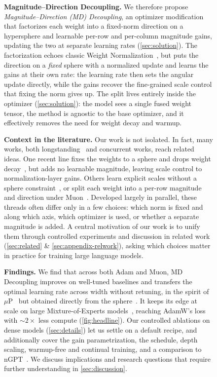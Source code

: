 \documentclass[10pt]{article} %
\begin{document}
\begin{figure}[t]
\textbf{Magnitude--Direction Decoupling.} 
We therefore propose \emph{Magnitude--Direction (MD) Decoupling}, an optimizer modification that factorizes each weight into a fixed-norm direction on a hypersphere and learnable per-row and per-column magnitude gains, updating the two at separate learning rates (\autoref{sec:solution}). The factorization echoes classic Weight Normalization~\citep{salimans2016weight}, but puts the direction on a \emph{fixed} sphere with a normalized update and learns the gains at their own rate: the learning rate then sets the angular update directly, while the gains recover the fine-grained scale control that fixing the norm gives up. The split lives entirely inside the optimizer (\autoref{sec:solution}): the model sees a single fused weight tensor, the method is agnostic to the base optimizer, and it effectively removes the need for weight decay and warmup.

\textbf{Context in the literature.} 
Our work is not isolated. In fact, many works, both longstanding~\citep{you2017large,liu2018decoupled,liu2021learning,karras2023analyzing} and concurrent works, reach related ideas. One recent line fixes the weights to a sphere and drops weight decay~\citep{loshchilov2024ngpt,muonh2026,franke2025learning,ren2026rethinking,bernstein2025modular}, but adds no learnable magnitude, leaving scale control to normalization-layer gains. Others learn explicit scales without a sphere constraint~\citep{velikanov2026learnable,wang2026negligible}, or split each weight into a per-row magnitude and direction under Muon~\citep{lion2026muown,huebler2026angularmuown}. Developed largely in parallel, these threads often differ only in a few choices: which norm is fixed and along which axis, which optimizer is used, or whether a separate magnitude is added. A central motivation of our work is to unify them through controlled experiments and discussion in related work (\autoref{sec:related} \& \autoref{sec:appendix-relwork}), asking which choices matter in practice for training large language models.

\textbf{Findings.} We find that across both Adam and Muon, MD Decoupling improves on well-tuned baselines and transfers the optimal learning rate across width without retuning, in the spirit of $\mu$P~\citep{yang2022tensor} but obtained directly from the sphere~\citep{kosson2025weight,muonh2026,ren2026rethinking}. It keeps its edge at scale on large Mixture-of-Experts models~\citep{shazeer2017outrageously,dai2024deepseekmoe}, reaching AdamW's loss with ${\sim}2\times$ less compute (\autoref{fig:headline}). Our controlled ablations on dense models (\autoref{sec:details}) let us settle on a default recipe, and additionally cover the gain parametrization, the schedule, depth scaling, warmup-free and continual training, and a comparison to nGPT~\citep{loshchilov2024ngpt}. We discuss implications and research questions that require further understanding in \autoref{sec:discussion}.



\end{figure}
\end{document}
